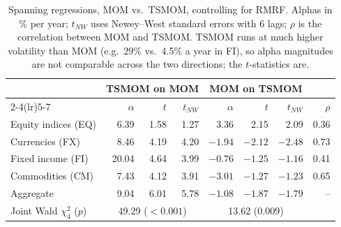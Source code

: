 \documentclass[11pt]{article}
\begin{document}
\begin{table}[H]
\centering\small
\caption{Spanning regressions, MOM vs.\ TSMOM, controlling for RMRF. Alphas in \% per year;
$t_{NW}$ uses Newey--West standard errors with 6 lags; $\rho$ is the correlation between
MOM and TSMOM. TSMOM runs at much higher volatility than MOM (e.g.\ 29\% vs.\ 4.5\% a year
in FI), so alpha magnitudes are not comparable across the two directions; the
$t$-statistics are.}
\label{tab:m}
\begin{tabular}{lrrrrrrr}
\toprule
 & \multicolumn{3}{c}{TSMOM on MOM} & \multicolumn{3}{c}{MOM on TSMOM} & \\
\cmidrule(lr){2-4}\cmidrule(lr){5-7}
 & $\alpha$ & $t$ & $t_{NW}$ & $\alpha$ & $t$ & $t_{NW}$ & $\rho$\\
\midrule
Equity indices (EQ) & 6.39 & 1.58 & 1.27 & 3.36 & 2.15 & 2.09 & 0.36\\
Currencies (FX)     & 8.46 & 4.19 & 4.20 & $-1.94$ & $-2.12$ & $-2.48$ & 0.73\\
Fixed income (FI)   & 20.04 & 4.64 & 3.99 & $-0.76$ & $-1.25$ & $-1.16$ & 0.41\\
Commodities (CM)    & 7.43 & 4.12 & 3.91 & $-3.01$ & $-1.27$ & $-1.23$ & 0.65\\
Aggregate           & 9.04 & 6.01 & 5.78 & $-1.08$ & $-1.87$ & $-1.79$ & --\\
\midrule
Joint Wald $\chi^2_4$ ($p$) & \multicolumn{3}{c}{49.29 ($<0.001$)} & \multicolumn{3}{c}{13.62 (0.009)} & \\
\bottomrule
\end{tabular}
\end{table}
\end{document}
